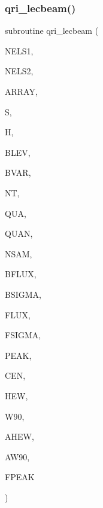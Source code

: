 \subsubsection{\texorpdfstring{qri\+\_\+lecbeam()}{qri\_lecbeam()}}
{\footnotesize\ttfamily subroutine qri\+\_\+lecbeam (\begin{DoxyParamCaption}\item[{integer}]{N\+E\+L\+S1,  }\item[{integer}]{N\+E\+L\+S2,  }\item[{double precision, dimension(nels1,nels2)}]{A\+R\+R\+AY,  }\item[{double precision}]{S,  }\item[{double precision}]{H,  }\item[{double precision}]{B\+L\+EV,  }\item[{double precision}]{B\+V\+AR,  }\item[{integer}]{NT,  }\item[{double precision, dimension(nt,nt)}]{Q\+UA,  }\item[{double precision, dimension(nt,nt)}]{Q\+U\+AN,  }\item[{integer}]{N\+S\+AM,  }\item[{double precision}]{B\+F\+L\+UX,  }\item[{double precision}]{B\+S\+I\+G\+MA,  }\item[{double precision}]{F\+L\+UX,  }\item[{double precision}]{F\+S\+I\+G\+MA,  }\item[{double precision, dimension(2)}]{P\+E\+AK,  }\item[{double precision, dimension(2)}]{C\+EN,  }\item[{double precision}]{H\+EW,  }\item[{double precision}]{W90,  }\item[{double precision}]{A\+H\+EW,  }\item[{double precision}]{A\+W90,  }\item[{double precision}]{F\+P\+E\+AK }\end{DoxyParamCaption})}

